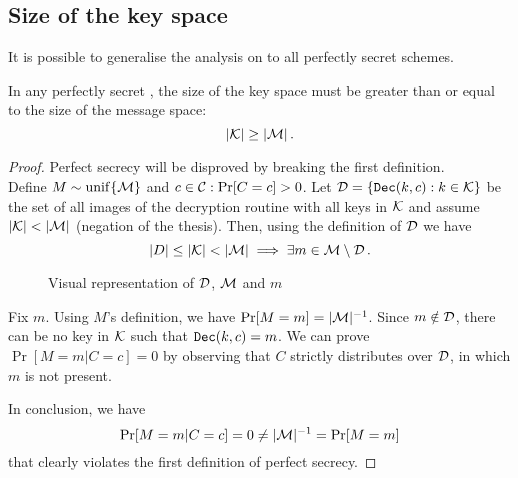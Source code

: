 \subsection{Size of the key space}
It is possible to generalise the analysis on \otp{} to all perfectly secret schemes.

\begin{theorem}
    In any perfectly secret \ske, the size of the key space must be greater than or equal to the size of the message space:
    \[
    	|\mathcal{K}| \geq |\mathcal{M}| \, .
    \]
\end{theorem}
\begin{proof}
    Perfect secrecy will be disproved by breaking the first definition. \\
    Define $M \sim \operatorname{unif}\{\mathcal{M}\}$ and $c \in \mathcal{C} : \Pr[C = c] > 0$.
    Let $\mathcal{D} = \{\texttt{Dec}(k, c) : k \in \mathcal{K}\}$ be the set of all images of the decryption routine with all keys in $\mathcal{K}$ and assume $|\mathcal{K}| < |\mathcal{M}|$ (negation of the thesis).
    Then, using the definition of $\mathcal{D}$ we have
    \[
        |D| \leq |\mathcal{K}| < |\mathcal{M}| \implies \exists m \in \mathcal{M} \setminus \mathcal{D} \, .
    \]
    
    \begin{figure}[h]
    	\centering
    	
    	\caption{Visual representation of $\mathcal{D}$, $\mathcal{M}$ and $m$}
    \end{figure}

    Fix $m$. Using $M$'s definition, we have $\Pr[M = m] = |\mathcal{M}|^{-1}$.
    Since $m \notin \mathcal{D}$, there can be no key in $\mathcal{K}$ such that $\texttt{Dec}(k, c) = m$.
    We can prove $\Pr[M = m|C = c] = 0$ by observing that $C$ strictly distributes over $\mathcal{D}$, in which $m$ is not present.
    
    In conclusion, we have
    \[
        \Pr[M = m|C = c] = 0 \neq |\mathcal{M}|^{-1} = \Pr[M = m]
    \]
    that clearly violates the first definition of perfect secrecy.
\end{proof}

